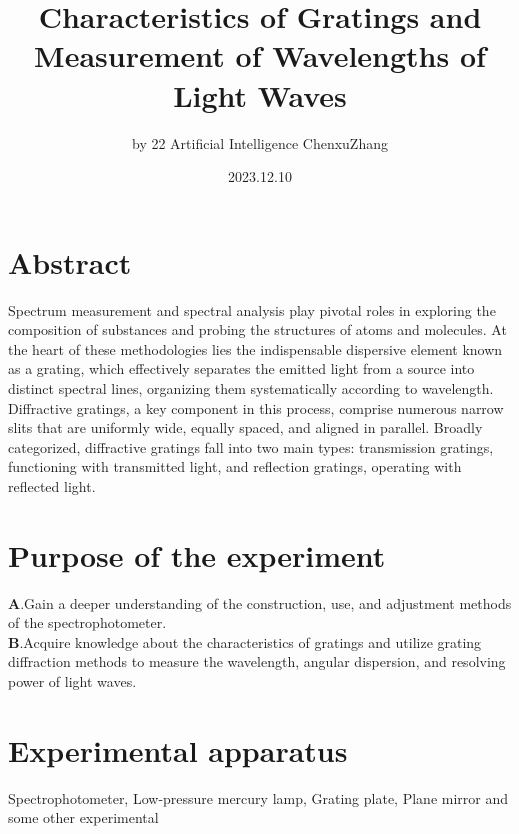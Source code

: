 \documentclass[UTF8]{article}
\title{Characteristics of Gratings and Measurement of Wavelengths of Light Waves}
\author{by 22 Artificial Intelligence ChenxuZhang}
\date{2023.12.10}
\begin{document}
	
	\fancyfoot[C]{\thepage}
	
	\maketitle
	\tableofcontents
	\newpage
	
	\section{Abstract}
	
Spectrum measurement and spectral analysis play pivotal roles in exploring the composition of substances and probing the structures of atoms and molecules. At the heart of these methodologies lies the indispensable dispersive element known as a grating, which effectively separates the emitted light from a source into distinct spectral lines, organizing them systematically according to wavelength. Diffractive gratings, a key component in this process, comprise numerous narrow slits that are uniformly wide, equally spaced, and aligned in parallel. Broadly categorized, diffractive gratings fall into two main types: transmission gratings, functioning with transmitted light, and reflection gratings, operating with reflected light.

 
	
\section{Purpose of the experiment}
   $\bm{A}$.Gain a deeper understanding of the construction, use, and adjustment methods of the spectrophotometer.\\
   $\bm{B}$.Acquire knowledge about the characteristics of gratings and utilize grating diffraction methods to measure the wavelength, angular dispersion, and resolving power of light waves.\\
   
	\section{Experimental apparatus}
    Spectrophotometer, Low-pressure mercury lamp, Grating plate, Plane mirror and some other experimental
    
\end{document}
